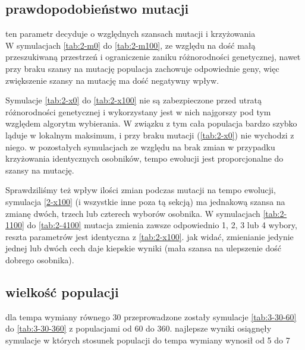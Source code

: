 \documentclass{article}
\begin{document}


\subsection{prawdopodobieństwo mutacji}
ten parametr decyduje o względnych szansach mutacji i krzyżowania
\\
W symulacjach \ref{tab:2-m0} do \ref{tab:2-m100}, ze względu na dość małą przeszukiwaną
przestrzeń i ograniczenie zaniku różnorodności genetycznej, nawet przy braku
szansy na mutację populacja zachowuje odpowiednie geny, więc zwiększenie szansy
na mutację ma dość negatywny wpływ.







Symulacje \ref{tab:2-x0} do \ref{tab:2-x100} nie są zabezpieczone przed utratą
różnorodności genetycznej i wykorzystany jest w nich najgorszy pod tym względem
algorytm wybierania. W związku z tym cała populacja bardzo szybko ląduje w
lokalnym maksimum, i przy braku mutacji (\ref{tab:2-x0}) nie wychodzi z niego. w
pozostałych symulacjach ze względu na brak zmian w przypadku krzyżowania
identycznych osobników, tempo ewolucji jest proporcjonalne do szansy na mutację.







Sprawdziliśmy też wpływ ilości zmian podczas mutacji na tempo ewolucji, symulacja
\ref{2-x100} (i wszystkie inne poza tą sekcją) ma jednakową szansa na zmianę
dwóch, trzech lub czterech
wyborów osobnika. W symulacjach \ref{tab:2-1100} do \ref{tab:2-4100} mutacja
zmienia zawsze odpowiednio 1, 2, 3 lub 4 wybory, reszta parametrów jest
identyczna z \ref{tab:2-x100}. jak widać, zmienianie jedynie jednej lub dwóch
cech daje kiepskie wyniki (mała szansa na ulepszenie dość dobrego osobnika).
\\






\subsection{wielkość populacji}

dla tempa wymiany równego 30 przeprowadzone zostały symulacje \ref{tab:3-30-60}
do \ref{tab:3-30-360} z populacjami od 60 do 360. najlepsze wyniki osiągnęły
symulacje w których stosunek populacji do tempa wymiany wynosił od 5 do 7
\end{document}
